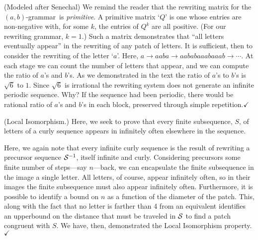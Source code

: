 \documentclass[11pt]{article}
\def\emph#1{{\em #1\/}}
\def\term#1{\emph{#1}}
\def\QED{$\checkmark$}
\def\ni{\noindent}
\def\ab{$(a,b)$}
\def\abg{\ab-grammar}
\def\q#1{`$#1$'}
\begin{document}
\ni{\bf Alternative proof.}(Modeled after Senechal\cite{Se95})  
We remind the reader that the
rewriting matrix for the \abg\ is \term{primitive}.  A primitive matrix
\q{Q} is one whose entries are non-negative with, for some $k$, the entries of
$Q^k$ are all positive. (For our rewriting grammar, $k=1$.)  Such a matrix
demonstrates that ``all letters eventually appear'' in the rewriting of any
patch of letters.  It is sufficient, then to consider the rewriting of the
letter \q{a}.  Here, $a\rightarrow aaba \rightarrow aababaaabaaab \rightarrow \cdots$.  At each stage we can count the number of letters that
appear, and we can compute the ratio of $a$'s and $b$'s.  As we demonstrated
in the text the ratio of $a$'s to $b$'s is $\sqrt{6}$ to $1$.  Since
$\sqrt{6}$ is irrational the rewriting system does not generate an infinite
periodic sequence.  Why? If the sequence had been periodic, there would be
rational ratio of $a$'s and $b$'s in each block, preserved through simple
repetition.\QED

\medskip
\ni(Local Isomorphism.)  Here, we seek to prove that every finite subsequence, $S$, of letters of a curly sequence appears in infinitely often elsewhere in the sequence.

Here, we again note that every infinite curly sequence is the result of
rewriting a precursor sequence $\mathcal{S}^{-1}$, itself infinite and curly.
Considering precursors some finite number of steps---say $n$---back, we can encapsulate
the finite subsequence in the image a single letter.  All letters, of course,
appear infinitely often, so in their images the finite subsequence must also
appear infinitely often.  Furthermore, it is possible to identify a bound
on $n$ as a function of the diameter of the patch.  This, along with the fact
that no letter is farther than 4 from an equivalent identifies an upperbound
on the distance that must be traveled in $\mathcal{S}$ to find a patch congruent with
$S$.  We have, then, demonstrated the Local Isomorphism property.\QED

\newpage
\pagestyle{empty}
\nocite{Ch09,Ch13,VDB07}


\end{document}
